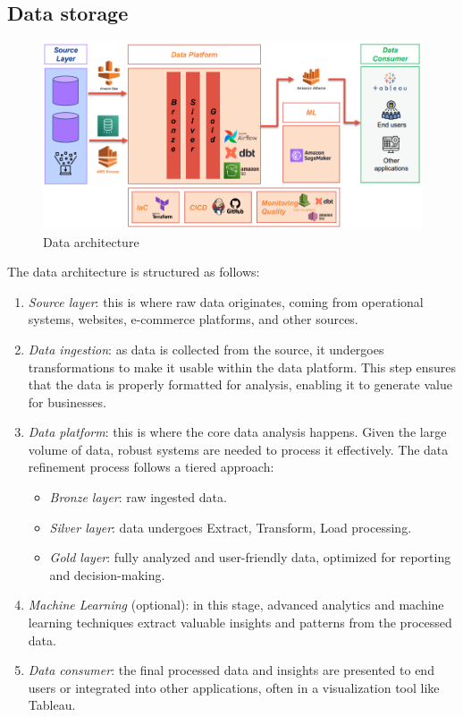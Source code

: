 \subsection{Data storage}
\begin{figure}[H]
    \centering
    \includegraphics[width=0.5\linewidth]{images/bis4.png}
    \caption{Data architecture}
\end{figure}
The data architecture is structured as follows:
\begin{enumerate}
    \item \textit{Source layer}: this is where raw data originates, coming from operational systems, websites, e-commerce platforms, and other sources.
    \item \textit{Data ingestion}: as data is collected from the source, it undergoes transformations to make it usable within the data platform. 
        This step ensures that the data is properly formatted for analysis, enabling it to generate value for businesses.
    \item \textit{Data platform}: this is where the core data analysis happens. 
        Given the large volume of data, robust systems are needed to process it effectively. 
        The data refinement process follows a tiered approach:
        \begin{itemize}
            \item \textit{Bronze layer}: raw ingested data.
            \item \textit{Silver layer}: data undergoes Extract, Transform, Load processing.
            \item \textit{Gold layer}: fully analyzed and user-friendly data, optimized for reporting and decision-making.
        \end{itemize}
    \item \textit{Machine Learning} (optional): in this stage, advanced analytics and machine learning techniques extract valuable insights and patterns from the processed data.
    \item \textit{Data consumer}: the final processed data and insights are presented to end users or integrated into other applications, often in a visualization tool like Tableau.
\end{enumerate}
